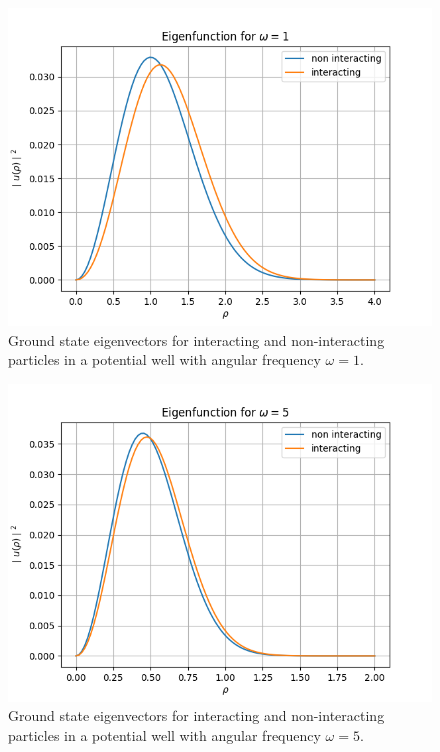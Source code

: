 \documentclass{emulateapj}
\begin{document}
\begin{figure}[H]
    \centering
    \includegraphics[scale=0.5]{omega1.png}
    \caption{Ground state eigenvectors for interacting and non-interacting particles in a potential well with angular frequency $\omega = 1$.}
    \label{fig:5}
\end{figure}
\begin{figure}[H]
    \centering
    \includegraphics[scale=0.5]{omega5.png}
    \caption{Ground state eigenvectors for interacting and non-interacting particles in a potential well with angular frequency $\omega = 5$.}
    \label{fig:6}
\end{figure}
\end{document}
